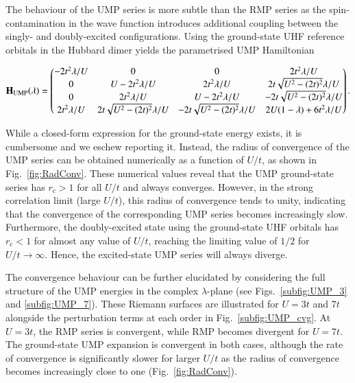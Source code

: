 \documentclass[aps,prb,reprint,noshowkeys,superscriptaddress]{revtex4-1}
\newcommand{\bH}{\mathbf{H}}
\newcommand{\rc}{r_{\text{c}}}
\begin{document}
The behaviour of the UMP series is more subtle than the RMP series as the spin-contamination in the wave function
introduces additional coupling between the singly- and doubly-excited configurations.
Using the ground-state UHF reference orbitals in the Hubbard dimer yields the parametrised UMP Hamiltonian
\begin{widetext}
\begin{equation}
\label{eq:H_UMP}
\bH_\text{UMP}\qty(\lambda) = 
	\begin{pmatrix}
		-2t^2 \lambda/U	&	0									&	0									&	2t^2 \lambda/U		\\
		0				&	U - 2t^2 \lambda/U 					&	2t^2\lambda/U						&	2t \sqrt{U^2 - (2t)^2} \lambda/U	\\
		0				&	2t^2\lambda/U						&	U - 2t^2 \lambda/U 					&	-2t \sqrt{U^2 - (2t)^2} \lambda/U	\\
		2t^2 \lambda/U	&	2t \sqrt{U^2 - (2t)^2} \lambda/U 	&	-2t \sqrt{U^2 - (2t)^2} \lambda/U	&	2U(1-\lambda) + 6t^2\lambda/U		\\
	\end{pmatrix}.
\end{equation}
\end{widetext}
While a closed-form expression for the ground-state energy exists, it is cumbersome and we eschew reporting it.
Instead, the radius of convergence of the UMP series can be obtained numerically as a function of $U/t$, as shown
in Fig.~\ref{fig:RadConv}.
These numerical values reveal that the UMP ground-state series has $\rc > 1$ for all $U/t$ and always converges.
However, in the strong correlation limit (large $U/t$), this radius of convergence tends to unity, indicating that
the convergence of the corresponding UMP series becomes increasingly slow.
Furthermore, the doubly-excited state using the ground-state UHF orbitals has $\rc < 1$ for almost any value 
of $U/t$, reaching the limiting value of $1/2$ for $U/t \to \infty$. Hence, the 
excited-state UMP series will always diverge.
 
The convergence behaviour can be further elucidated by considering the full structure of the UMP energies 
in the complex $\lambda$-plane (see Figs.~\ref{subfig:UMP_3} and \ref{subfig:UMP_7}).
These Riemann surfaces are illustrated for $U = 3t$ and $7t$ alongside the perturbation terms at each order
in Fig.~\ref{subfig:UMP_cvg}.
At $U = 3t$, the RMP series is convergent, while RMP becomes divergent for $U=7t$.
The ground-state UMP expansion is convergent in both cases, although the rate of convergence is significantly slower 
for larger $U/t$ as the radius of convergence becomes increasingly close to one (Fig.~\ref{fig:RadConv}).
\end{document}
